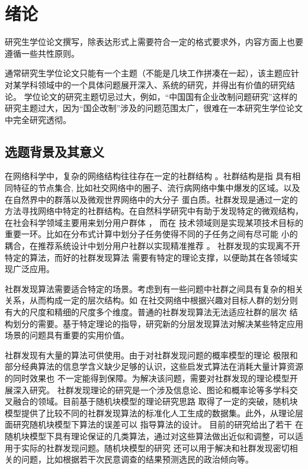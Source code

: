 
\chapter{绪论}

研究生学位论文撰写，除表达形式上需要符合一定的格式要求外，内容方面上也要遵循一些共性原则。

通常研究生学位论文只能有一个主题（不能是几块工作拼凑在一起），该主题应针对某学科领域中的一个具体问题展开深入、系统的研究，并得出有价值的研究结论。
学位论文的研究主题切忌过大，例如，“中国国有企业改制问题研究”这样的研究主题过大，因为“国企改制”涉及的问题范围太广，很难在一本研究生学位论文中完全研究透彻。


\section{选题背景及其意义}
在网络科学中，复杂的网络结构往往存在一定的社群结构 \cite{fortunato2010community} 。社群结构是指
具有相同特征的节点集合,
比如社交网络中的圈子、流行病网络中集中爆发的区域。以及在自然界中的群落以及微观世界网络中的大分子
蛋白质。社群发现是通过一定的方法寻找网络中特定的社群结构。在自然科学研究中有助于发现特定的微观结构，
在社会科学领域主要用来划分用户群体 \cite{6750167}，
而在
技术领域则是实现某项技术目标的重要一环。比如在分布式计算中划分子任务使得不同的子任务之间有尽可能
小的耦合，在推荐系统设计中划分用户社群以实现精准推荐 \cite{10.1145/2739480.2754670}。
社群发现的实现离不开特定的算法，而好的社群发现算法
需要有特定的理论支撑，以便助其在各领域实现广泛应用。

社群发现算法需要适合特定的场景。考虑到有一些问题中社群之间具有复杂的相关关系，从而构成一定的层次结构。如
在社交网络中根据兴趣对目标人群的划分则有大的尺度和精细的尺度多个维度。普通的社群发现算法无法适应社群的层次
结构划分的需要。基于特定理论的指导，研究新的分层发现算法对解决某些特定应用场景的问题具有重要的实用价值。

社群发现有大量的算法可供使用。由于对社群发现问题的概率模型的理论
极限和部分经典算法的信息学含义缺少足够的认识，这些启发式算法在消耗大量计算资源的同时效果也
不一定能得到保障。为解决该问题，需要对社群发现的理论模型开展深入研究。
社群发现理论的研究是一个涉及信息论、图论和概率论等多学科交叉融合的领域。目前基于随机块模型的理论研究思路
取得了一定的突破，随机块模型提供了比较不同的社群发现算法的标准化人工生成的数据集。此外，从理论层面研究随机块模型下算法的误差可以
指导算法的设计。
目前的研究给出了若干
在随机块模型下具有理论保证的几类算法，通过对这些算法做出近似和调整，可以适用于实际的社群发现问题。随机块模型的研究
还可以用于解决和社群发现密切相关的问题，比如根据若干次民意调查的结果预测选民的政治倾向等。

